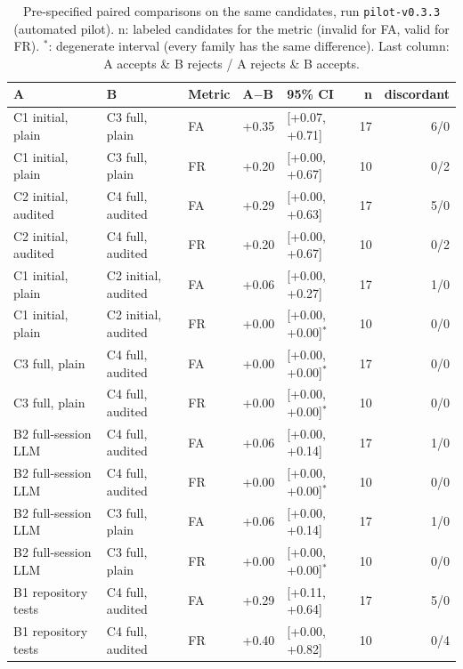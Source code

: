 \begin{table}[t]\centering\footnotesize
\caption{Pre-specified paired comparisons on the same candidates, run \texttt{pilot-v0.3.3} (automated pilot). n: labeled candidates for the metric (invalid for FA, valid for FR). $^{*}$: degenerate interval (every family has the same difference). Last column: A accepts \& B rejects / A rejects \& B accepts.}\label{tab:comparisons}
\begin{tabular}{lllllrr}\toprule A & B & Metric & A$-$B & 95\% CI & n & discordant \\\midrule
C1 initial, plain & C3 full, plain & FA & +0.35 & [+0.07, +0.71] & 17 & 6/0 \\
C1 initial, plain & C3 full, plain & FR & +0.20 & [+0.00, +0.67] & 10 & 0/2 \\
C2 initial, audited & C4 full, audited & FA & +0.29 & [+0.00, +0.63] & 17 & 5/0 \\
C2 initial, audited & C4 full, audited & FR & +0.20 & [+0.00, +0.67] & 10 & 0/2 \\
C1 initial, plain & C2 initial, audited & FA & +0.06 & [+0.00, +0.27] & 17 & 1/0 \\
C1 initial, plain & C2 initial, audited & FR & +0.00 & [+0.00, +0.00]$^{*}$ & 10 & 0/0 \\
C3 full, plain & C4 full, audited & FA & +0.00 & [+0.00, +0.00]$^{*}$ & 17 & 0/0 \\
C3 full, plain & C4 full, audited & FR & +0.00 & [+0.00, +0.00]$^{*}$ & 10 & 0/0 \\
B2 full-session LLM & C4 full, audited & FA & +0.06 & [+0.00, +0.14] & 17 & 1/0 \\
B2 full-session LLM & C4 full, audited & FR & +0.00 & [+0.00, +0.00]$^{*}$ & 10 & 0/0 \\
B2 full-session LLM & C3 full, plain & FA & +0.06 & [+0.00, +0.14] & 17 & 1/0 \\
B2 full-session LLM & C3 full, plain & FR & +0.00 & [+0.00, +0.00]$^{*}$ & 10 & 0/0 \\
B1 repository tests & C4 full, audited & FA & +0.29 & [+0.11, +0.64] & 17 & 5/0 \\
B1 repository tests & C4 full, audited & FR & +0.40 & [+0.00, +0.82] & 10 & 0/4 \\
\bottomrule\end{tabular}\end{table}

